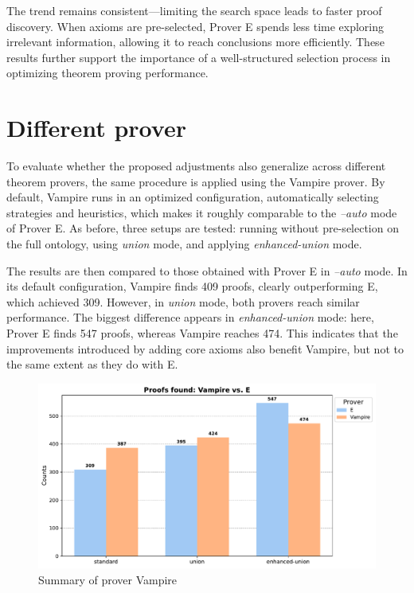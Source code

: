 \documentclass[english,version-2020-11]{uzl-thesis}
\begin{document}
The trend remains consistent—limiting the search space leads to faster proof discovery. When axioms are pre-selected, Prover E spends less time exploring irrelevant information, allowing it to reach conclusions more efficiently. These results further support the importance of a well-structured selection process in optimizing theorem proving performance.


\section{Different prover}
To evaluate whether the proposed adjustments also generalize across different theorem provers, the same procedure is applied using the Vampire prover. By default, Vampire runs in an optimized configuration, automatically selecting strategies and heuristics, which makes it roughly comparable to the \textit{--auto} mode of Prover E. As before, three setups are tested: running without pre-selection on the full ontology, using \textit{union} mode, and applying \textit{enhanced-union} mode.

The results are then compared to those obtained with Prover E in \textit{--auto} mode. In its default configuration, Vampire finds 409 proofs, clearly outperforming E, which achieved 309. However, in \textit{union} mode, both provers reach similar performance. The biggest difference appears in \textit{enhanced-union} mode: here, Prover E finds 547 proofs, whereas Vampire reaches 474. This indicates that the improvements introduced by adding core axioms also benefit Vampire, but not to the same extent as they do with E.

\begin{figure}[h!]
    \centering
    \includegraphics[width=\textwidth]{vampire_mode_output.pdf}
    \caption{Summary of prover Vampire}
    \label{fig:prover_results_vampire}
\end{figure}
\FloatBarrier
\end{document}
